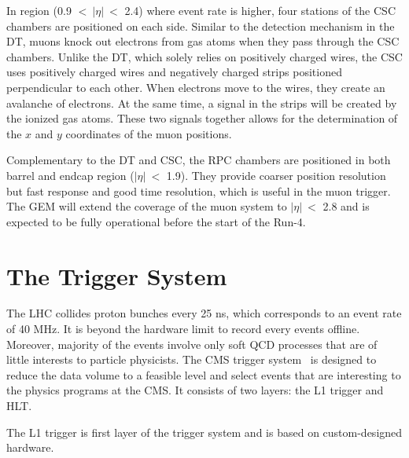 In region (0.9 $<~|\eta|~<$ 2.4) where event rate is higher, four stations of the \ac{CSC} chambers are positioned on each side. Similar to the detection mechanism in the \ac{DT}, muons knock out electrons from gas atoms when they pass through the \ac{CSC} chambers. Unlike the \ac{DT}, which solely relies on positively charged wires, the \ac{CSC} uses positively charged wires and negatively charged strips positioned perpendicular to each other. When electrons move to the wires, they create an avalanche of electrons. At the same time, a signal in the strips will be created by the ionized gas atoms. These two signals together allows for the determination of the $x$ and $y$ coordinates of the muon positions. 

Complementary to the \ac{DT} and \ac{CSC}, the \ac{RPC} chambers are positioned in both barrel and endcap region ($|\eta|~<$ 1.9). They provide coarser position resolution but fast response and good time resolution, which is useful in the muon trigger. The \ac{GEM} will extend the coverage of the muon system to $|\eta|~<$ 2.8 and is expected to be fully operational before the start of the Run-4. 

\section{The Trigger System}
\label{sec:TrigSys}
 
The \ac{LHC} collides proton bunches every 25 ns, which corresponds to an event rate of 40 MHz. It is beyond the hardware limit to record every events offline. Moreover, majority of the events involve only soft \ac{QCD} processes that are of little interests to particle physicists. The \ac{CMS} trigger system~\cite{CMS:2016ngn} is designed to reduce the data volume to a feasible level and select events that are interesting to the physics programs at the \ac{CMS}. It consists of two layers: the \ac{L1} trigger and \ac{HLT}.

The \ac{L1} trigger is first layer of the trigger system and is based on custom-designed hardware.

